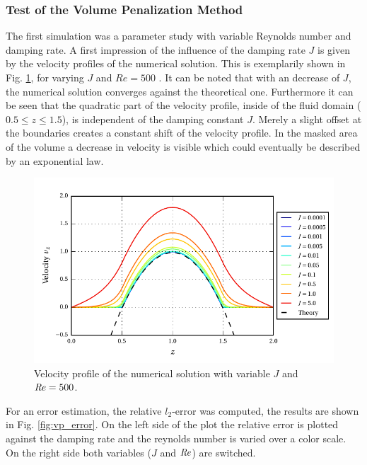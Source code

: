 \subsubsection{Test of the Volume Penalization Method}

The first simulation was  a parameter study with variable Reynolds number and damping rate.
A first impression of the influence of the damping rate $J$ is given by the velocity profiles of the numerical solution.
This is exemplarily shown in Fig. \ref{fig:vp_flow}, for varying $J$ and $Re=500$ .
It can be noted that with an decrease of $J$, the numerical solution converges against the theoretical one.
Furthermore it can be seen that the quadratic part of the velocity profile,
inside of the fluid domain ($0.5\leq z \leq 1.5$), is independent of the damping constant $J$.
Merely a slight offset at the boundaries creates a constant shift of the velocity profile.
In the masked area of the volume a decrease in velocity is visible which could  eventually be described by an
exponential law.

\begin{figure}[!t]
  \centering
  \includegraphics{gfx/immersed_boundary/poiseuille_flow/2_vp/vp_profile.pdf}  \caption{\label{fig:vp_flow}
    Velocity profile of the numerical solution with variable $J$ and $\mbox{\textit{Re}} = 500$.}
\end{figure}

For an error estimation, the relative $l_2$-error was computed, the results are shown in Fig. \ref{fig:vp_error}.
On the left side of the plot the relative error is plotted against the damping rate and the reynolds number is
varied over a color scale. On the right side both variables ($J$ and $\mbox{\textit{Re}}$) are switched.

